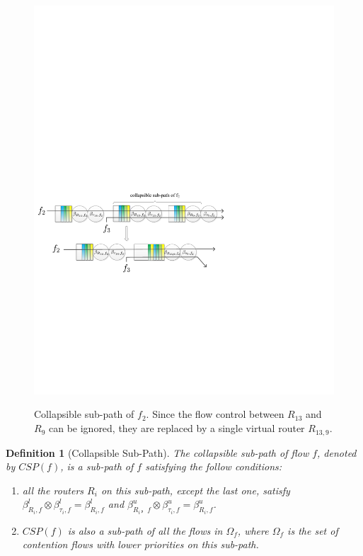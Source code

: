 \documentclass[10pt,journal]{IEEEtran}
\newtheorem{definition}{Definition}
\begin{document}
\begin{figure}
  \centering
  \includegraphics[scale=0.65]{figures/collapse.pdf}\\
  \caption{Collapsible sub-path of $f_2$. Since the flow control between $R_{13}$ and $R_9$ can be ignored, they are replaced by a single virtual router $R_{13,9}$.}\label{collapse}
\end{figure}

\begin{definition}[Collapsible Sub-Path]
The collapsible sub-path of flow $f$, denoted by $CSP(f)$, is a sub-path of $f$ satisfying the follow conditions:
\begin{enumerate}
  \item all the routers $R_i$ on this sub-path, except the last one, satisfy $\beta_{R_{i},f}^l\otimes\beta_{\tau_{i},f}^l=\beta_{R_{i},f}^l$ and $\beta_{R_{i}，f}^u\otimes\beta_{\tau_{i},f}^u=\beta_{R_{i},f}^u$.
  \item $CSP(f)$ is also a sub-path of all the flows in $\Omega_{f}$, where $\Omega_{f}$ is the set of contention flows with lower priorities on this sub-path.
\end{enumerate}
\end{definition}
\end{document}
